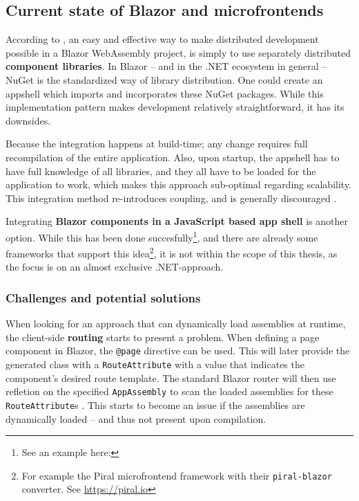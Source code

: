 \subsection{Current state of Blazor and microfrontends}

According to \textcite{Rappl_MunichNETMeetup_2020}, an easy and effective way to
make distributed development possible in a Blazor WebAssembly project, is simply
to use separately distributed \textbf{component libraries}. In Blazor -- and in
the .NET ecosystem in general -- NuGet is
the standardized way of library distribution. One could create an \gls{appshell}
which imports and incorporates these NuGet packages. While this implementation
pattern makes development relatively straightforward, it has its downsides.

Because the integration happens at build-time; any change requires full
recompilation of the entire application. Also, upon startup, the \gls{appshell}
has to have full knowledge of all libraries, and they all have to be loaded for
the application to work, which makes this approach sub-optimal regarding
scalability. This integration method re-introduces coupling, and is generally
discouraged \autocite{Jackson_2019}.

Integrating \textbf{Blazor components in a JavaScript based app shell} is
another option. While this has been done succesfully\footnote{See an example
here: }, and
there are already some frameworks that support this idea\footnote{For example
the Piral microfrontend framework with their \texttt{piral-blazor} converter.
See \url{https://piral.io}}, it is not within the scope of this thesis, as the
focus is on an almost exclusive .NET-approach.

\subsubsection{Challenges and potential solutions}

When looking for an approach that can dynamically load assemblies at runtime,
the client-side \textbf{routing} starts to present a problem. When defining a
page component in Blazor, the \texttt{@page} directive can be used. This will
later provide the generated class with a \texttt{RouteAttribute} with a value
that indicates the component's desired route template. The standard Blazor
router will then use refletion on the specified \texttt{AppAssembly} to scan the
loaded assemblies for these \texttt{RouteAttribute}s \autocite{Sainty_2019}.
This starts to become an issue if the assemblies are dynamically loaded -- and
thus not present upon compilation. 

